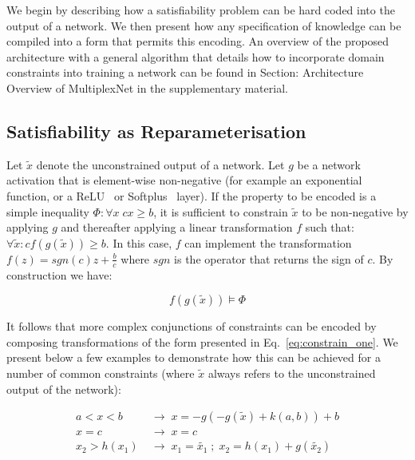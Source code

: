 \documentclass[letterpaper]{article} %
\begin{document}
We begin by describing how a satisfiability problem can be hard coded into the output of a network. 
We then present how any specification of knowledge can be compiled into a form that permits this encoding.
An overview of the proposed architecture with a general algorithm that details how to incorporate domain constraints into training a network can be found in Section: Architecture Overview of MultiplexNet in the supplementary material.

\subsection{Satisfiability as Reparameterisation}
\label{sec:sat_as_reparam}

Let $\tilde{x}$ denote the unconstrained output of a network. 
Let $g$ be a network activation that is element-wise non-negative (for example an exponential function, or a ReLU~\citep{nair2010rectified} or Softplus~\citep{dugas2001incorporating} layer).
If the property to be encoded is a simple inequality $\Phi: \forall x \; c x \geq b$, it is sufficient to constrain $\tilde{x}$ to be non-negative by applying $g$ and thereafter applying a linear transformation $f$ such that:
$\forall \tilde{x}: c f(g(\tilde{x})) \geq b$.
In this case, ${f}$ can implement the transformation $f(z) = sgn(c)z + \frac{b}{c}$ where $sgn$ is the operator that returns the sign of $c$.
By construction we have:

\begin{equation}
    \label{eq:constrain_one}
        f(g(\tilde{x})) \models \Phi
\end{equation}

It follows that more complex conjunctions of constraints can be encoded by composing transformations of the form presented in Eq.~\ref{eq:constrain_one}.
We present below a few examples to demonstrate how this can be achieved for a number of common constraints (where $\tilde{x}$ always refers to the unconstrained output of the network):

\begin{align}
    \label{eq:common_operations_line1}
    a < x < b \; &\rightarrow \; x = -g(-g(\tilde{x}) + k(a, b)) + b \\
    \label{eq:common_operations_line2}
    x = c \; &\rightarrow \; x = c \\
    \label{eq:common_operations_line3}
    x_2 > h(x_1) \; &\rightarrow \; x_1 = \tilde{x_1} \; ; \; x_2 = h(x_1) + g(\tilde{x_2})
\end{align}
\end{document}
